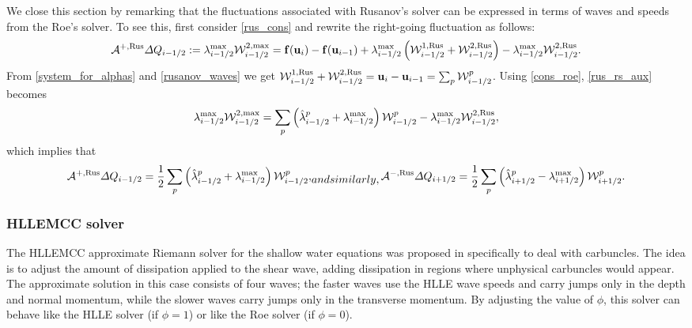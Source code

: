 \documentclass[preprint, 11pt]{article}
\newcommand{\W}{{\mathcal W}}
\newcommand{\A}{{\mathcal A}}
\newcommand{\bff}{{\bf f}}
\newcommand{\bfu}{{\bf u}}
\newcommand{\Rus}{{\rm Rus}}
\begin{document}
We close this section by remarking that the fluctuations associated with Rusanov's solver 
can be expressed in terms of waves and speeds from the Roe's solver. To see this, first consider \eqref{rus_cons}
and rewrite the right-going fluctuation as follows:
\begin{align}\label{rus_rs_aux}
  \A^{+,\Rus}\Delta Q_{i-1/2}:=\lambda_{i-1/2}^{\max}\W_{i-1/2}^{2,\max}
  = \bff(\bfu_{i})-\bff(\bfu_{i-1}) + \lambda_{i-1/2}^{\max}\left(\W_{i-1/2}^{1,\Rus}+\W_{i-1/2}^{2,\Rus}\right)
  -\lambda_{i-1/2}^{\max}\W_{i-1/2}^{2,\Rus}.
\end{align}
From \eqref{system_for_alphas} and \eqref{rusanov_waves} we get 
$\W^{1,\Rus}_{i-1/2}+\W^{2,\Rus}_{i-1/2}=\bfu_i-\bfu_{i-1}=\sum_p\W_{i-1/2}^p$. 
Using \eqref{cons_roe}, \eqref{rus_rs_aux} becomes 
\begin{align*}
  \lambda_{i-1/2}^{\max}\W_{i-1/2}^{2,\max}
  = \sum_p \left(\hat \lambda_{i-1/2}^p + \lambda_{i-1/2}^{\max}\right)\W_{i-1/2}^p
  -\lambda_{i-1/2}^{\max}\W_{i-1/2}^{2,\Rus},
\end{align*}
which implies that 
\begin{subequations}\label{fluct_rus}
\begin{align}
  \A^{+,\Rus}\Delta Q_{i-1/2}=\frac{1}{2}\sum_p\left(\hat \lambda_{i-1/2}^p + \lambda_{i-1/2}^{\max}\right)\W_{i-1/2}^p,
\end{align}
and similarly, 
\begin{align}
  \A^{-,\Rus}\Delta Q_{i+1/2}=\frac{1}{2}\sum_p\left(\hat \lambda_{i+1/2}^p - \lambda_{i+1/2}^{\max}\right)\W_{i+1/2}^p.
\end{align}
\end{subequations}

\subsubsection{HLLEMCC solver}
The HLLEMCC approximate Riemann solver for the shallow water equations was proposed
in \cite{kemm2014note} specifically to deal with carbuncles.  The idea is to adjust
the amount of dissipation applied to the shear wave, adding dissipation in regions
where unphysical carbuncles would appear.  The approximate solution in this
case consists of four waves; the faster waves use the HLLE wave speeds and carry
jumps only in the depth and normal momentum, while the slower waves carry jumps
only in the transverse momentum.  By adjusting the value of $\phi$, this solver
can behave like the HLLE solver (if $\phi=1$) or like the Roe solver (if $\phi=0$).
\end{document}
